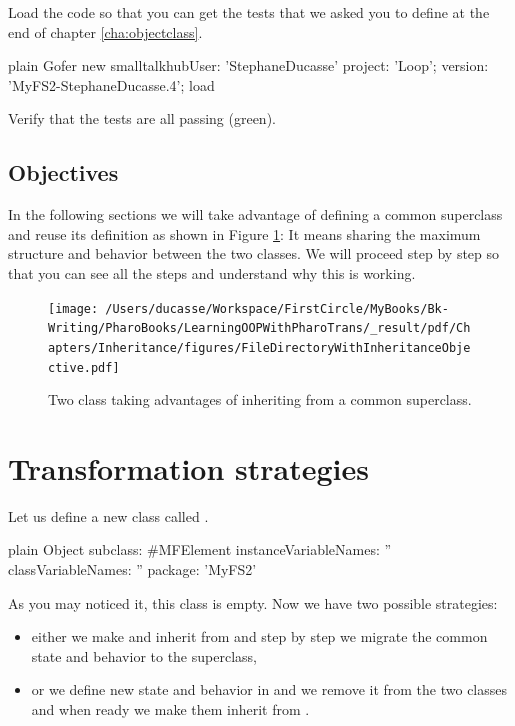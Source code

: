 \documentclass[10pt,twoside,english]{_support/latex/sbabook/sbabook}
\begin{document}
Load the code so that you can get the tests that we asked you to define at the end of chapter \ref{cha:objectclass}.

\begin{displaycode}{plain}
Gofer new
	smalltalkhubUser: 'StephaneDucasse' project: 'Loop'; 
	version: 'MyFS2-StephaneDucasse.4';
	load
\end{displaycode}

Verify that the tests are all passing (green).
\subsection{Objectives}
In the following sections we will take advantage of defining a common superclass and reuse its definition as shown in Figure \ref{FileDirectoryWithInheritanceObjective}: It means sharing the maximum structure and behavior between the two classes. We will proceed step by step so that you can see all the steps and understand why this is working.


\begin{figure}

\begin{center}
\texttt{[image: /Users/ducasse/Workspace/FirstCircle/MyBooks/Bk-Writing/PharoBooks/LearningOOPWithPharoTrans/\_result/pdf/Chapters/Inheritance/figures/FileDirectoryWithInheritanceObjective.pdf]}\caption{Two class taking advantages of inheriting from a common superclass.\label{FileDirectoryWithInheritanceObjective}}\end{center}
\end{figure}

\section{Transformation strategies}
Let us define a new class called . 

\begin{displaycode}{plain}
Object subclass: #MFElement
	instanceVariableNames: ''
	classVariableNames: ''
	package: 'MyFS2'
\end{displaycode}

As you may noticed it, this class is empty. Now we have two possible strategies: 

\begin{itemize}
\item either we make  and  inherit from  and  step by step we migrate the common state and behavior to the superclass,
\item or we define new state and behavior in  and we remove it  from the two classes and when ready we make them inherit from . 
\end{itemize}
\end{document}
